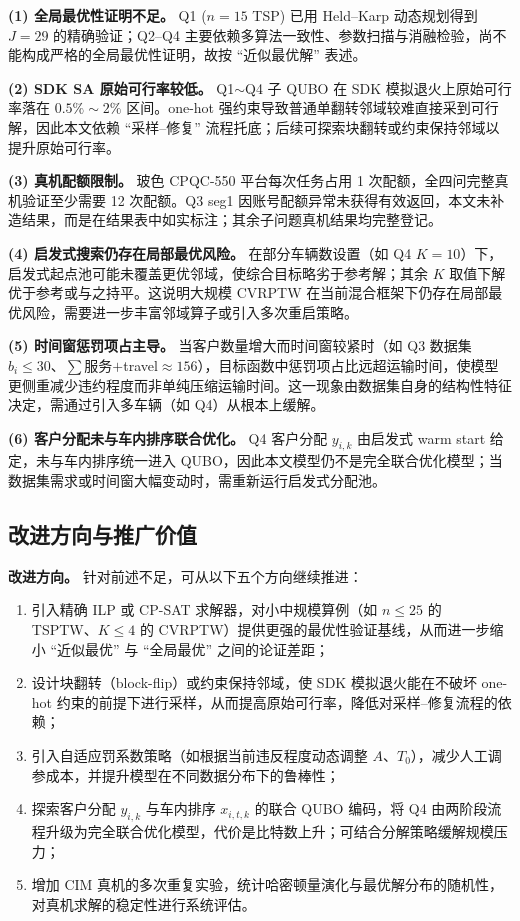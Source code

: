 \documentclass[UTF8,12pt,a4paper]{ctexart}
\begin{document}
\textbf{(1) 全局最优性证明不足。} Q1 ($n=15$ TSP) 已用 Held--Karp 动态规划得到 $J=29$ 的精确验证；Q2--Q4 主要依赖多算法一致性、参数扫描与消融检验，尚不能构成严格的全局最优性证明，故按 ``近似最优解'' 表述。

\textbf{(2) SDK SA 原始可行率较低。} Q1$\sim$Q4 子 QUBO 在 SDK 模拟退火上原始可行率落在 $0.5\%\sim 2\%$ 区间。one-hot 强约束导致普通单翻转邻域较难直接采到可行解，因此本文依赖 ``采样--修复'' 流程托底；后续可探索块翻转或约束保持邻域以提升原始可行率。

\textbf{(3) 真机配额限制。} 玻色 CPQC-550 平台每次任务占用 1 次配额，全四问完整真机验证至少需要 12 次配额。Q3 seg1 因账号配额异常未获得有效返回，本文未补造结果，而是在结果表中如实标注；其余子问题真机结果均完整登记。

\textbf{(4) 启发式搜索仍存在局部最优风险。} 在部分车辆数设置（如 Q4 $K=10$）下，启发式起点池可能未覆盖更优邻域，使综合目标略劣于参考解；其余 $K$ 取值下解优于参考或与之持平。这说明大规模 CVRPTW 在当前混合框架下仍存在局部最优风险，需要进一步丰富邻域算子或引入多次重启策略。

\textbf{(5) 时间窗惩罚项占主导。} 当客户数量增大而时间窗较紧时（如 Q3 数据集 $b_i\le 30$、$\sum$服务$+$travel$\approx 156$），目标函数中惩罚项占比远超运输时间，使模型更侧重减少违约程度而非单纯压缩运输时间。这一现象由数据集自身的结构性特征决定，需通过引入多车辆（如 Q4）从根本上缓解。

\textbf{(6) 客户分配未与车内排序联合优化。} Q4 客户分配 $y_{i,k}$ 由启发式 warm start 给定，未与车内排序统一进入 QUBO，因此本文模型仍不是完全联合优化模型；当数据集需求或时间窗大幅变动时，需重新运行启发式分配池。

\subsection{改进方向与推广价值}

\textbf{改进方向。} 针对前述不足，可从以下五个方向继续推进：

\begin{enumerate}[label=(\arabic*),leftmargin=*]
    \item 引入精确 ILP 或 CP-SAT 求解器，对小中规模算例（如 $n\le 25$ 的 TSPTW、$K\le 4$ 的 CVRPTW）提供更强的最优性验证基线，从而进一步缩小 ``近似最优'' 与 ``全局最优'' 之间的论证差距；
    \item 设计块翻转（block-flip）或约束保持邻域，使 SDK 模拟退火能在不破坏 one-hot 约束的前提下进行采样，从而提高原始可行率，降低对采样--修复流程的依赖；
    \item 引入自适应罚系数策略（如根据当前违反程度动态调整 $A$、$T_0$），减少人工调参成本，并提升模型在不同数据分布下的鲁棒性；
    \item 探索客户分配 $y_{i,k}$ 与车内排序 $x_{i,t,k}$ 的联合 QUBO 编码，将 Q4 由两阶段流程升级为完全联合优化模型，代价是比特数上升；可结合分解策略缓解规模压力；
    \item 增加 CIM 真机的多次重复实验，统计哈密顿量演化与最优解分布的随机性，对真机求解的稳定性进行系统评估。
\end{enumerate}
\end{document}
